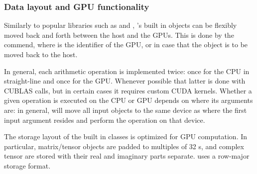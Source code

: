 \subsubsection*{Data layout and GPU functionality}

Similarly to popular libraries such as  and , \Cengine{}'s built in 
objects can be flexibly moved back and forth between the host and the GPUs. 
This is done by the  commend, where  is the identifier of the GPU, or 
 in case that the object is to be moved back to the host. 

In general, each arithmetic operation is implemented twice: once for the CPU in straight-line \cpp{} 
and once for the GPU. Whenever possible that latter is done with CUBLAS calls, but in certain 
cases it requires custom CUDA kernels. 
Whether a given operation is executed on the CPU or GPU depends on where its arguments are: in general, 
\Cengine{} will move all input objects to the same device as where the first input argument resides 
and perform the operation on that device.

The storage layout of the built in classes is optimized for GPU computation. In particular, 
matrix/tensor objects are padded to multiples of 32 s, and complex tensor are stored 
with their real and imaginary parts separate. \Cengine{} uses a row-major storage format.   